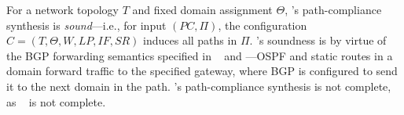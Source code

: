 For a network topology $T$ and 
fixed domain assignment $\Theta$, \name's path-compliance
synthesis is \emph{sound}---i.e., for input $(PC, \Pi)$, the configuration 
$C = (T, \Theta,W,LP,IF,SR)$ induces all paths in $\Pi$. 
\name's soundness is by virtue of the BGP forwarding semantics specified in ~
and ---OSPF and static routes in a domain 
forward traffic to the specified gateway, where BGP is configured to 
send it to the next domain in the path. 
\name's path-compliance synthesis is not complete, 
as ~ is not complete. 